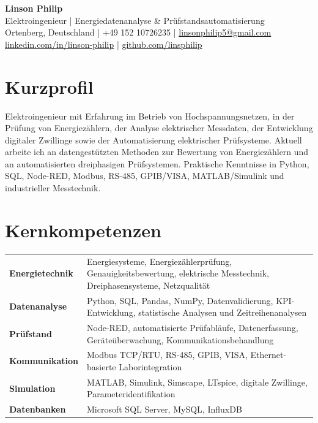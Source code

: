 \documentclass[10pt,a4paper]{article}
\begin{document}
\begin{center}
{\LARGE\bfseries\color{navy} Linson Philip}\\[2pt]
{\large Elektroingenieur | Energiedatenanalyse \& Prüfstandsautomatisierung}\\[4pt]
Ortenberg, Deutschland \;|\; +49 152 10726235 \;|\; \href{mailto:linsonphilip5@gmail.com}{linsonphilip5@gmail.com}\\[1pt]
\href{https://www.linkedin.com/in/linson-philip}{linkedin.com/in/linson-philip} \;|\; \href{https://github.com/linsphilip}{github.com/linsphilip}
\end{center}

\section{Kurzprofil}
Elektroingenieur mit Erfahrung im Betrieb von Hochspannungsnetzen, in der Prüfung von Energiezählern, der Analyse elektrischer Messdaten, der Entwicklung digitaler Zwillinge sowie der Automatisierung elektrischer Prüfsysteme. Aktuell arbeite ich an datengestützten Methoden zur Bewertung von Energiezählern und an automatisierten dreiphasigen Prüfsystemen. Praktische Kenntnisse in Python, SQL, Node-RED, Modbus, RS-485, GPIB/VISA, MATLAB/Simulink und industrieller Messtechnik.

\section{Kernkompetenzen}
\begin{tabularx}{\textwidth}{@{}>{\bfseries}p{3.55cm}X@{}}
Energietechnik & Energiesysteme, Energiezählerprüfung, Genauigkeitsbewertung, elektrische Messtechnik, Dreiphasensysteme, Netzqualität\\
Datenanalyse & Python, SQL, Pandas, NumPy, Datenvalidierung, KPI-Entwicklung, statistische Analysen und Zeitreihenanalysen\\
Prüfstand & Node-RED, automatisierte Prüfabläufe, Datenerfassung, Geräteüberwachung, Kommunikationsbehandlung\\
Kommunikation & Modbus TCP/RTU, RS-485, GPIB, VISA, Ethernet-basierte Laborintegration\\
Simulation & MATLAB, Simulink, Simscape, LTspice, digitale Zwillinge, Parameteridentifikation\\
Datenbanken & Microsoft SQL Server, MySQL, InfluxDB\\
\end{tabularx}
\end{document}

